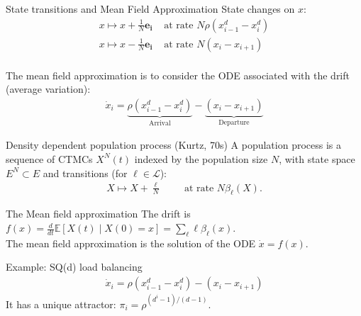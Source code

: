 \documentclass{beamer}
\newcommand\mpage[2]{%
  \begin{minipage}{#1\linewidth}%
    #2%
  \end{minipage}%
}
\newcommand\esp[1]{\mathbb{E}\left[#1\right]}
\newcommand\calL{\mathcal{L}}
\begin{document}
\begin{frame}{State transitions and Mean Field Approximation}
  State changes on $x$:
  \begin{align*}
    x\mapsto x + \frac1N\mathbf{e_i} & \text{ at rate $N\rho(x_{i-1}^d-x_{i}^d)$}\\
    x\mapsto x - \frac1N\mathbf{e_i} & \text{ at rate $N(x_i-x_{i+1})$}\\
  \end{align*}

  The mean field approximation is to consider the ODE associated with
  the drift (average variation):
  \begin{align*}
    \dot{x}_i = \underbrace{\rho(x_{i-1}^d-x_{i}^d)}_{\mathrm{Arrival}}
    -\underbrace{(x_i-x_{i+1})}_{\mathrm{Departure}}
  \end{align*}
\end{frame}

\begin{frame}{Density dependent population process (Kurtz, 70s)}
  A population process is a sequence of CTMCs $X^N(t)$ indexed by the
  population size $N$, with state space $E^N\subset E$ and
  transitions (for $\ell\in\calL$): 
  \begin{align*}
    X \mapsto X+\frac{\ell}{N} \qquad \text{ at rate
    $N\beta_\ell(X)$}.
  \end{align*}
  \pause
  
  \begin{center}
    \mpage{.9}{
      \begin{exampleblock}{The Mean field approximation}
        The \alert{drift} is
        $\displaystyle f(x) = \frac{d}{dt}\esp{X(t)\mid
          X(0)=x}=\sum_{\ell} \ell \beta_\ell(x)$.\\
        The mean field approximation is the solution of the ODE
        $\dot{x}=f(x)$.
      \end{exampleblock}
    }
  \end{center}
  \bigskip\pause
  \alert{Example}: SQ(d) load balancing
  \begin{align*}
    \dot{x}_i = \rho(x_{i-1}^d - x_i^d) - (x_i-x_{i+1})
  \end{align*}
  It has a unique attractor: $\pi_i=\rho^{(d^i-1)/(d-1)}$. 
\end{frame}
\end{document}
